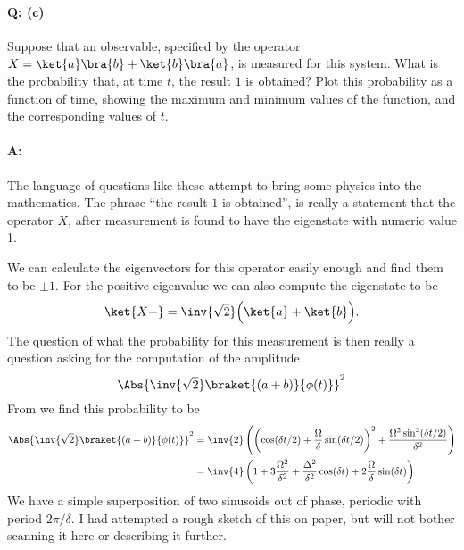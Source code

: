 {\paragraph{Q: (c)}

Suppose that an observable, specified by the operator \(X = \ket{a}\bra{b} + \ket{b}\bra{a}\), is measured for this system.  What is the probability that, at time \(t\), the result \(1\) is obtained?  Plot this probability as a function of time, showing the maximum and minimum values of the function, and the corresponding values of \(t\).

\paragraph{A:}

The language of questions like these attempt to bring some physics into the mathematics.  The phrase ``the result \(1\) is obtained'', is really a statement that the operator \(X\), after measurement is found to have the eigenstate with numeric value 1.

We can calculate the eigenvectors for this operator easily enough and find them to be \(\pm 1\).  For the positive eigenvalue we can also compute the eigenstate to be
%
\begin{equation}\label{eqn:qmIexamPractice2008Dec:2:120}
\ket{X+} = \inv{\sqrt{2}} \Bigl( \ket{a} + \ket{b} \Bigr).
\end{equation}
%
The question of what the probability for this measurement is then really a question asking for the computation of the amplitude
%
\begin{equation}\label{eqn:qmIexamPractice2008Dec:2:130}
\Abs{
\inv{\sqrt{2}}
\braket{
 (a + b)}{\phi(t)}}^2
\end{equation}
%
From  we find this probability to be
%
\begin{equation}\label{eqn:qmIexamPractice2008Dec:710}
\begin{aligned}
\Abs{
\inv{\sqrt{2}}
\braket{
 (a + b)}{\phi(t)}}^2
&=
\inv{2} \left(
\left(\cos(\delta t/2) + \frac{\Omega}{\delta} \sin(\delta t/2)\right)^2
+ \frac{ \Omega^2 \sin^2(\delta t/2)}{\delta^2}
\right) \\
&=
\inv{4} \left( 1 + 3 \frac{\Omega^2}{\delta^2} + \frac{\Delta^2}{\delta^2} \cos (\delta t) + 2 \frac{ \Omega}{\delta} \sin(\delta t) \right)
\end{aligned}
\end{equation}
%
We have a simple superposition of two sinusoids out of phase, periodic with period \(2 \pi/\delta\).  I had attempted a rough sketch of this on paper, but will not bother scanning it here or describing it further.

}
